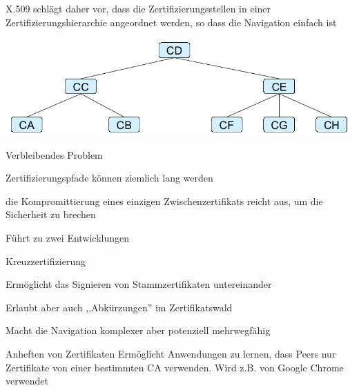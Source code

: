 \documentclass[a4paper]{article}
\begin{document}
\begin{multicols}{3}
\begin{itemize*}
            \item X.509 schlägt daher vor, dass die Zertifizierungsstellen in einer Zertifizierungshierarchie angeordnet werden, so dass die Navigation einfach ist
            \item \includegraphics[width=.5\linewidth]{Assets/NetworkSecurity-x509-hierarchy.png}
            \item Verbleibendes Problem
            \begin{itemize*}
                  \item Zertifizierungspfade können ziemlich lang werden
                  \item die Kompromittierung eines einzigen Zwischenzertifikats reicht aus, um die Sicherheit zu brechen
                  \item Führt zu zwei Entwicklungen
            \end{itemize*}
      \end{itemize*}
      \begin{description*}
            \item[Kreuzzertifizierung]
            \begin{itemize*}
                  \item Ermöglicht das Signieren von Stammzertifikaten untereinander
                  \item Erlaubt aber auch ,,Abkürzungen'' im Zertifikatswald
                  \item Macht die Navigation komplexer aber potenziell mehrwegfähig
            \end{itemize*}
            \item[Anheften von Zertifikaten] Ermöglicht Anwendungen zu lernen, dass Peers nur Zertifikate von einer bestimmten CA verwenden. Wird z.B. von Google Chrome verwendet%
      \end{description*}


\end{multicols}
\end{document}
